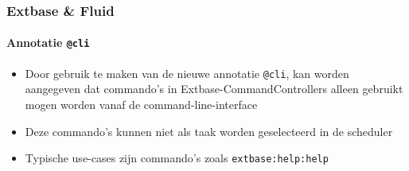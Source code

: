\begin{frame}[fragile]
	\frametitle{Extbase \& Fluid}
	\framesubtitle{Annotatie \texttt{@cli}}

	\begin{itemize}

		\item Door gebruik te maken van de nieuwe annotatie \texttt{@cli}, kan worden aangegeven dat commando's in 
			Extbase-CommandControllers alleen gebruikt mogen worden vanaf de command-line-interface

		\item Deze commando's kunnen niet als taak worden geselecteerd in de scheduler

		\item Typische use-cases zijn commando's zoals \texttt{extbase:help:help}

	\end{itemize}

\end{frame}

